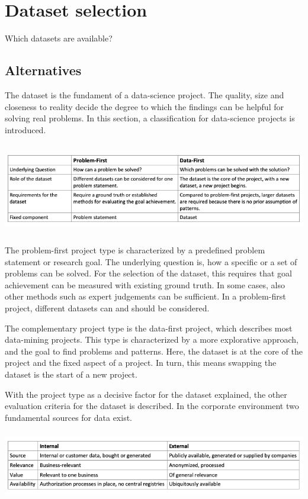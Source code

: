 \chapter{Dataset selection}
Which datasets are available?

\section{Alternatives}

	The dataset is the fundament of a data-science project. The quality, size and closeness to reality decide the degree to which the findings can be helpful for solving real problems. 
	In this section, a classification for data-science projects is introduced.
	
	\includegraphics[height=4cm]{Bilder/meta_project.png}
	
	The problem-first project type is characterized by a predefined problem statement or research goal. The underlying question is, how a specific or a set of problems can be solved. For the selection of the dataset, this requires that goal achievement can be measured with existing ground truth. In some cases, also other methods such as expert judgements can be sufficient. In a problem-first project, different datasets can and should be considered.
	
	The complementary project type is the data-first project, which describes most data-mining projects. This type is characterized by a more explorative approach, and the goal to find problems and patterns. Here, the dataset is at the core of the project and the fixed aspect of a project. In turn, this means swapping the dataset is the start of a new project.
	
	With the project type as a decisive factor for the dataset explained, the other evaluation criteria for the dataset is described. In the corporate environment two fundamental sources for data exist. 
	
	\includegraphics[height=3cm]{Bilder/internal_external.png}
	
